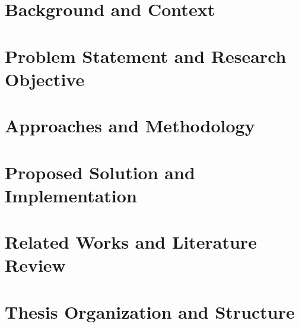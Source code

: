 
\setlength{\parskip}{\baselineskip}



\section{Background and Context}
\section{Problem Statement and Research Objective}
\section{Approaches and Methodology}
\section{Proposed Solution and Implementation}
\section{Related Works and Literature Review}
\section{Thesis Organization and Structure}
